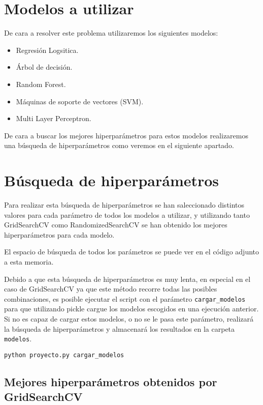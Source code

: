 \section{Modelos a utilizar}

De cara a resolver este problema utilizaremos los siguientes modelos:

\begin{itemize}
	\item Regresión Logsitica.
	\item Árbol de decisión.
	\item Random Forest.
	\item Máquinas de soporte de vectores (SVM).
	\item Multi Layer Perceptron.
\end{itemize}


De cara a buscar los mejores hiperparámetros para estos modelos realizaremos una búsqueda de hiperparámetros como veremos en el siguiente apartado.

\section{Búsqueda de hiperparámetros}

Para realizar esta búsqueda de hiperparámetros se han saleccionado distintos valores para cada parámetro de todos los modelos a utilizar, y utilizando tanto GridSearchCV como RandomizedSearchCV se han obtenido los mejores hiperparámetros para cada modelo.

El espacio de búsqueda de todos los parámetros se puede ver en el código adjunto a esta memoria.

Debido a que esta búsqueda de hiperparámetros es muy lenta, en especial en el caso de GridSearchCV ya que este método recorre todas las posibles combinaciones, es posible ejecutar el script con el parámetro \texttt{cargar\_modelos} para que utilizando pickle cargue los modelos escogidos en una ejecución anterior. Si no es capaz de cargar estos modelos, o no se le pasa este parámetro, realizará la búsqueda de hiperparámetros y almacenará los resultados en la carpeta \texttt{modelos}.

\begin{lstlisting}
python proyecto.py cargar_modelos
\end{lstlisting}

\subsection{Mejores hiperparámetros obtenidos por GridSearchCV}

